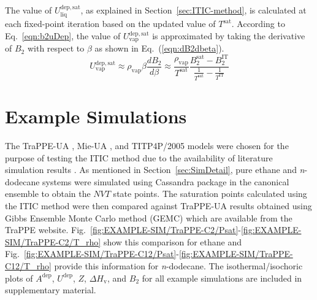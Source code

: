 \documentclass[%
 aip,
 jcp,
 sd,%
 amsmath,amssymb,
 reprint,%
]{revtex4-1}
\begin{document}
The value of $U^{\mathrm{dep, sat}}_\mathrm{liq}$, as explained in Section~\ref{sec:ITIC-method}, is calculated at each fixed-point iteration based on the updated value of $T^{\mathrm{sat}}$. According to Eq.~\ref{eqn:b2uDep}, the value of $U^{\mathrm{dep, sat}}_\mathrm{vap}$ is approximated by taking the derivative of $B_2$ with respect to $\beta$ as shown in Eq.~(\ref{eqn:dB2dbeta}).
\begin{equation}
U^{\mathrm{dep, sat}}_\mathrm{vap}\approx \rho_{\mathrm{vap}} \beta \frac{dB_2}{d\beta} \approx \frac{\rho_{\mathrm{vap}}}{T^{\mathrm{sat}}} \frac{B_2^{\mathrm{sat}}-B_2^{\mathrm{IT}}}{\frac{1}{T^{\mathrm{sat}}} - \frac{1}{T^{\mathrm{IT}}}}
\label{eqn:dB2dbeta}
\end{equation}

\section{Example Simulations} \label{sec:ExampleSim}
The TraPPE-UA \cite{Martin1998,Martin1999,Wick2000}, Mie-UA \cite{Potoff2009,Mick2017,Barhaghi2017,Mick2015}, and TITP4P/2005 \cite{Abascal2005} models were chosen for the purpose of testing the ITIC method due to the availability of literature simulation results \cite{Martin1998,eggimann2014,Potoff2009,Shen2008}. As mentioned in Section~\ref{sec:SimDetail}, pure ethane and \textit{n}-dodecane systems were simulated using Cassandra package \cite{Shah2017} in the canonical ensemble to obtain the $NVT$ state points. The saturation points calculated using the ITIC method were then compared against TraPPE-UA results obtained using Gibbs Ensemble Monte Carlo method (GEMC) which are available from the TraPPE website.\cite{eggimann2014} Fig.~\ref{fig:EXAMPLE-SIM/TraPPE-C2/Psat}-\ref{fig:EXAMPLE-SIM/TraPPE-C2/T_rho} show this comparison for ethane and Fig.~\ref{fig:EXAMPLE-SIM/TraPPE-C12/Psat}-\ref{fig:EXAMPLE-SIM/TraPPE-C12/T_rho} provide this information for \textit{n}-dodecane. The isothermal/isochoric plots of $A^{\mathrm{dep}}$, $U^{\mathrm{dep}}$, $Z$, $\Delta H_{\mathrm{v}}$, and $B_2$ for all example simulations are included in supplementary material. 
\end{document}
